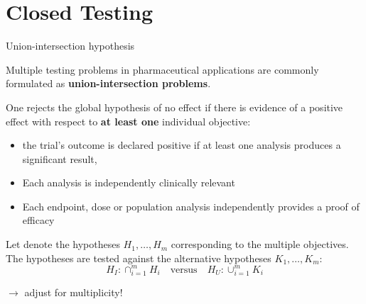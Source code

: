 \documentclass[xcolor={dvipsnames}]{beamer}
\newcommand{\rbf}[1]{\textcolor{redUnipd}{ #1}}
\begin{document}
\section{Closed Testing}
\begin{frame}{Union-intersection hypothesis}

Multiple testing problems in pharmaceutical applications are commonly formulated as \textbf{\rbf{union-intersection problems}}.

One rejects the global hypothesis of no effect if there is evidence of a positive effect with respect to \textbf{at least one} individual objective:

\begin{itemize}
    \item the trial's outcome is declared positive if at least one analysis produces a significant result,
    \item Each analysis is independently clinically relevant
    \item Each endpoint, dose or population analysis independently provides a proof of efficacy
\end{itemize}

Let denote the hypotheses $H_1, \dots, H_m$ corresponding to the multiple objectives. The hypotheses are tested against the alternative hypotheses $K_1, \dots, K_m$:
\begin{equation*}
    H_I: \cap_{i = 1}^m H_i \quad \text{versus} \quad H_U: \cup_{i=1}^m K_i
\end{equation*}

\bigskip

$\rightarrow$ adjust for multiplicity!

\end{frame}
\end{document}
